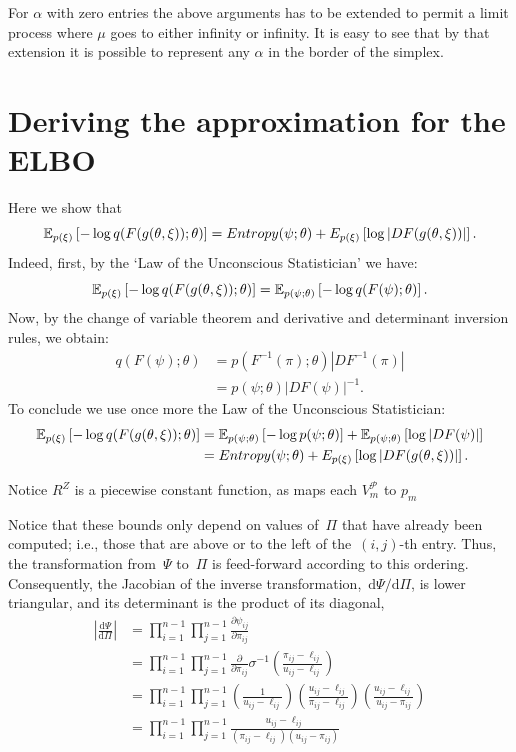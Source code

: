 For $\alpha$ with zero entries the above arguments has to be extended to permit a limit process where $\mu$ goes to either infinity or infinity. It is easy to see that by that extension it is possible to represent any $\alpha$ in the border of the simplex.

\section{Deriving  the approximation for the ELBO}
Here we show that $$\mathbb{E}_{p(\xi)} \left[- \log q(F(g(\theta, \xi)); \theta) \right] = Entropy(\psi; \theta)+E_{p(\xi)}\left[\log | DF(g(\theta, \xi))|\right].$$
Indeed, first, by the `Law of the Unconscious Statistician' we have:
 $$\mathbb{E}_{p(\xi)} \left[- \log q(F(g(\theta, \xi)); \theta) \right] = \mathbb{E}_{p(\psi;\theta)} \left[- \log q(F(\psi); \theta) \right]. $$
Now, by the change of variable theorem and derivative and determinant inversion rules, we obtain:\begin{align}
q(F(\psi); \theta) & = p(F^{-1}(\pi) ;\theta)  |DF ^{-1}(\pi) | \\
 & = p(\psi;\theta) | DF (\psi) | ^{-1}.
 \end{align}
 To conclude we use once more the Law of the Unconscious Statistician:
 \begin{align}
 \mathbb{E}_{p(\xi)} \left[- \log q(F(g(\theta, \xi)); \theta) \right]  &= \mathbb{E}_{p(\psi;\theta)}\left[ - \log p(\psi;\theta)\right] +   \mathbb{E}_{p(\psi;\theta)}\left[\log | DF(\psi)|\right] \\
 &= Entropy(\psi; \theta)+E_{p(\xi)}\left[\log | DF(g(\theta, \xi))|\right].\end{align}
 
 Notice $R^Z$ is a piecewise constant function, as maps each $V^\mathcal{P}_{m}$ to $p_m$

Notice that these bounds only depend on values of~${\Pi}$ that
have already been computed; i.e., those that are above or to the left of
the~$(i,j)$-th entry. Thus, the transformation from~$\Psi$ to~${\Pi}$
is feed-forward according to this ordering.  Consequently, the
Jacobian of the inverse transformation,~$\mathrm{d}\Psi / \mathrm{d} \Pi$,
is lower triangular, and its determinant is the product of its diagonal,
\begin{align}
\left| \frac{\mathrm{d} \Psi } {\mathrm{d} \Pi} \right|
&= \prod_{i=1}^{n-1} \prod_{j=1}^{n-1} \frac{\partial \psi_{ij} }{\partial {\pi}_{ij}} \\
&= \prod_{i=1}^{n-1} \prod_{j=1}^{n-1} \frac{\partial}{\partial {\pi}_{ij}}
\sigma^{-1} \left( \frac{{\pi}_{ij} - \ell_{ij}}{u_{ij} - \ell_{ij}} \right ) \\
&= \prod_{i=1}^{n-1} \prod_{j=1}^{n-1}
\left( \frac{1}{u_{ij} - \ell_{ij}} \right )
\left( \frac{u_{ij} - \ell_{ij}}{{\pi}_{ij} - \ell_{ij}} \right )
\left( \frac{u_{ij} - \ell_{ij}}{u_{ij} - {\pi}_{ij}} \right ) \\
&= \prod_{i=1}^{n-1} \prod_{j=1}^{n-1}
\frac{u_{ij} - \ell_{ij}}{({\pi}_{ij} - \ell_{ij}) (u_{ij} - {\pi}_{ij})}
\end{align}

